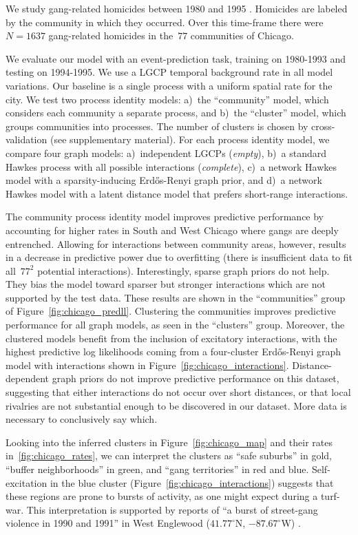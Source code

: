 We study gang-related homicides between 1980 and 1995 \cite{ICPSR}. Homicides are labeled by the community in which they occurred. Over this time-frame there were~${N=1637}$ gang-related homicides in the~${77}$ communities of Chicago. 

We evaluate our model with an event-prediction task, training on 1980-1993 and testing on 1994-1995. We use a LGCP temporal background rate in all model variations. Our baseline is a single process with a uniform spatial rate for the city.
We test two process identity models: a)~the ``community'' model, which considers each community a separate process, and b)~the ``cluster'' model, which groups communities into processes. The number of clusters is chosen by cross-validation (see supplementary material). For each process identity model, we compare four graph models: a)~independent LGCPs (\emph{empty}), b)~a standard Hawkes process with all possible interactions (\emph{complete}), c)~a network Hawkes model with a sparsity-inducing Erd\H{o}s-Renyi graph prior, and d)~a network Hawkes model with a latent distance model that prefers short-range interactions.

The community process identity model improves predictive performance by accounting for higher rates in South and West Chicago where gangs are deeply entrenched. Allowing for interactions between community areas, however, results in a decrease in predictive power due to overfitting (there is insufficient data to fit all~${77^2}$ potential interactions). Interestingly, sparse graph priors do not help. They bias the model toward sparser but stronger interactions which are not supported by the test data. These results are shown in the ``communities'' group of Figure~\ref{fig:chicago_predll}. Clustering the communities improves predictive performance for all graph models, as seen in the ``clusters'' group. Moreover, the clustered models benefit from the inclusion of excitatory interactions, with the highest predictive log likelihoods coming from a four-cluster Erd\H{o}s-Renyi graph model with interactions shown in Figure~\ref{fig:chicago_interactions}. Distance-dependent graph priors do not improve predictive performance on this dataset, suggesting that either interactions do not occur over short distances, or that local rivalries are not substantial enough to be discovered in our dataset. More data is necessary to conclusively say which.

Looking into the inferred clusters in Figure~\ref{fig:chicago_map} and their rates in~\ref{fig:chicago_rates}, we can interpret the clusters as ``safe suburbs'' in gold, ``buffer neighborhoods'' in green, and ``gang territories'' in red and blue. Self-excitation in the blue cluster (Figure~\ref{fig:chicago_interactions}) suggests that these regions are prone to bursts of activity, as one might expect during a turf-war. This interpretation is supported by reports of ``a burst of street-gang violence in 1990 and 1991'' in West Englewood (${41.77^\circ}$N, ${-87.67^\circ}$W) \cite{Block-1993}. 

